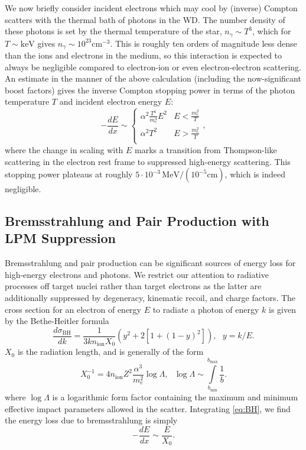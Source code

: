 \documentclass[twocolumn,showpacs,preprintnumbers,amsmath,amssymb,prd]{revtex4}
\newcommand{\MeV}{\text{MeV}}
\newcommand{\cm}{\text{cm}}
\begin{document}
\begin{appendices}
We now briefly consider incident electrons which may cool by (inverse) Compton scatters with the thermal bath of photons in the WD.  
The number density of these photons is set by the thermal temperature of the star, $n_\gamma \sim T^3$, which for $T \sim \text{keV}$ gives $n_\gamma \sim 10^{23} \cm^{-3}$.
This is roughly ten orders of magnitude less dense than the ions and electrons in the medium, so this interaction is expected to always be negligible compared to electron-ion or even electron-electron scattering.
An estimate in the manner of the above calculation (including the now-significant boost factors) gives the inverse Compton stopping power in terms of the photon temperature $T$ and incident electron energy $E$:  
\begin{equation}
\label{eq:invcomptonSP}
  -\frac{dE}{dx} \sim 
  \begin{cases}
    \alpha^2 \frac{T^4}{m_e^4} E^2 & E < \frac{m_e^2}{T} \\
    \alpha^2 T^2 & E > \frac{m_e^2}{T} \\
  \end{cases},
\end{equation}
where the change in scaling with $E$ marks a transition from Thompson-like scattering in the electron rest frame to suppressed high-energy scattering.
This stopping power plateaus at roughly $5\cdot10^{-3}\,\MeV/(10^{-5} \cm)$, which is indeed negligible. 

\subsection*{Bremsstrahlung and Pair Production with LPM Suppression}
Bremsstrahlung and pair production can be significant sources of energy loss for high-energy electrons and photons. We restrict our attention to radiative processes off target nuclei rather than target electrons as the latter are additionally suppressed by degeneracy, kinematic recoil, and charge factors. 
The cross section for an electron of energy $E$ to radiate a photon of energy $k$ is given by the Bethe-Heitler formula
\begin{equation}
\label{eq:BH}
\frac{d \sigma_\text{BH}}{dk} = \frac{1}{3 k n_\text{ion} X_0} (y^2+2 [1+ (1-y)^2]), ~~~ y = k/E.
\end{equation}
$X_0$ is the radiation length, and is generally of the form
\begin{equation}
\label{eq:radiationlength}
X_0^{-1} = 4 n_\text{ion} Z^2 \frac{\alpha^3}{m_e^2} \log{\Lambda}, ~~~ \log{\Lambda} \sim \int \limits_{b_\text{min}}^{b_\text{max}} \frac{1}{b}.
\end{equation}
where $\log{\Lambda}$ is a logarithmic form factor containing the maximum and minimum effective impact parameters allowed in the scatter.
Integrating \eqref{eq:BH}, we find the energy loss due to bremsstrahlung is simply 
\begin{equation}
-\frac{dE}{dx} \sim \frac{E}{X_0}.
\end{equation}


\end{appendices}
\end{document}
